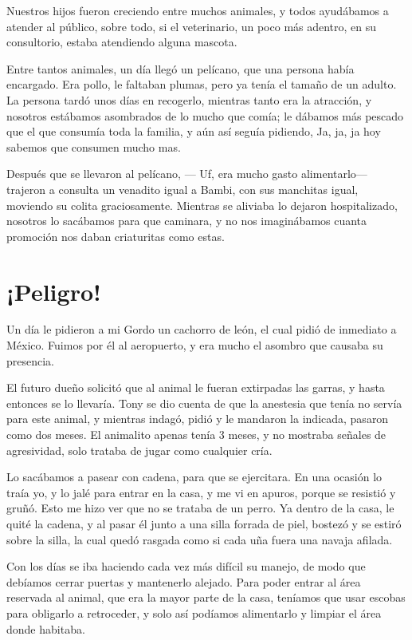 \documentclass[letterpaper, 12pt]{book}
\begin{document}
Nuestros hijos fueron creciendo entre muchos animales, y todos ayudábamos a atender al público, sobre todo, si el veterinario, un poco más adentro, en su consultorio, estaba atendiendo alguna mascota.

Entre tantos animales, un día llegó un pelícano, que una persona había encargado. Era pollo, le faltaban plumas, pero ya tenía el tamaño de un adulto.
 La persona tardó unos días en recogerlo, mientras tanto era la atracción, y nosotros estábamos asombrados de lo mucho que comía; le dábamos más pescado que el que consumía toda la familia, y aún así seguía pidiendo, Ja, ja, ja hoy sabemos que consumen mucho mas.
 
 Después que se llevaron al pelícano, --- Uf, era mucho gasto alimentarlo--- trajeron a consulta un venadito igual a Bambi, con sus manchitas igual, moviendo su colita graciosamente. Mientras se aliviaba lo dejaron hospitalizado, nosotros lo sacábamos para que caminara, y no nos imaginábamos cuanta promoción nos daban criaturitas como estas.
\chapter{¡Peligro!}
Un día le pidieron a mi Gordo un cachorro de león, el cual pidió de inmediato a México. Fuimos por él al aeropuerto, y era mucho el asombro que causaba su presencia.

El futuro dueño solicitó que al animal le fueran extirpadas las garras, y hasta entonces se lo llevaría. Tony se dio cuenta de que la anestesia que tenía no servía para este animal, y mientras indagó, pidió y le mandaron la indicada, pasaron como dos meses. El animalito apenas tenía 3 meses, y no mostraba señales de agresividad, solo trataba de jugar como cualquier cría.

Lo sacábamos a pasear con cadena, para que se ejercitara. En una ocasión lo traía yo, y lo jalé para entrar en la casa, y me vi en apuros, porque se resistió y gruñó. Esto me hizo ver que no se trataba de un perro. Ya dentro de la casa, le quité la cadena, y al pasar él junto a una silla forrada de piel, bostezó y se estiró sobre la silla, la cual quedó rasgada como si cada uña fuera una navaja afilada.

Con los días se iba haciendo cada vez más difícil su manejo, de modo que debíamos cerrar puertas y mantenerlo alejado. Para poder entrar al área reservada al animal, que era la mayor parte de la casa, teníamos que usar escobas para obligarlo a retroceder, y solo así podíamos alimentarlo y limpiar el área donde habitaba.
\end{document}
